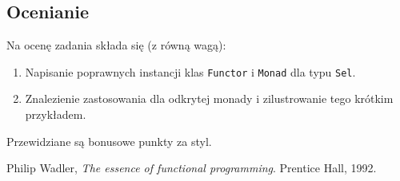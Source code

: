 \documentclass{article}[12pt]
\begin{document}
\subsection{Ocenianie}
Na ocenę zadania składa się (z równą wagą):
\begin{enumerate}
    \item Napisanie poprawnych instancji klas \texttt{Functor} i \texttt{Monad}
        dla typu \texttt{Sel}.
    \item Znalezienie zastosowania dla odkrytej monady i zilustrowanie tego
        krótkim przykładem.
\end{enumerate}
Przewidziane są bonusowe punkty za styl.

\begin{thebibliography}{9}
        Philip Wadler,
        \emph{The essence of functional programming}.
        Prentice Hall, 1992.
\end{thebibliography}
\end{document}
